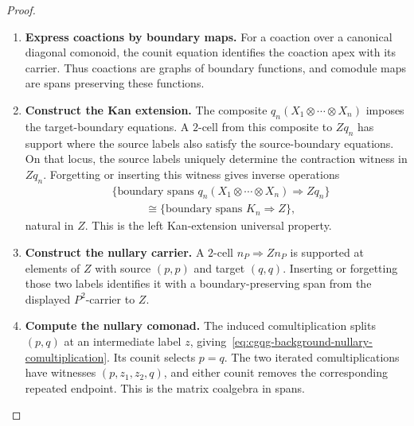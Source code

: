 \documentclass[oneside]{article}
\theoremstyle{plain}
\theoremstyle{definition}
\theoremstyle{remark}
\begin{document}
\begin{proof}
    \leavevmode
    \begin{enumerate}[beginpenalty=10000]
        \item \textbf{Express coactions by boundary maps.} For a coaction over a canonical diagonal comonoid, the counit equation identifies the coaction apex with its carrier. Thus coactions are graphs of boundary functions, and comodule maps are spans preserving these functions.

        \item \textbf{Construct the Kan extension.} The composite \(q_n(X_1\otimes\cdots\otimes X_n)\) imposes the
        target-boundary equations. A \(2\)-cell from this composite to \(Zq_n\)
        has support where the source labels also satisfy the
        source-boundary equations. On that locus, the source labels uniquely
        determine the contraction witness in \(Zq_n\).
        Forgetting or inserting this witness gives inverse operations
        \[
        \begin{aligned}
        &\{\text{boundary spans }q_n(X_1\otimes\cdots\otimes X_n)\Rightarrow Zq_n\}\\
        &\hspace{3em}\cong\{\text{boundary spans }K_n\Rightarrow Z\},
        \end{aligned}
        \]
        natural in \(Z\). This is the left Kan-extension universal property.

        \item \textbf{Construct the nullary carrier.} A \(2\)-cell \(n_P\Rightarrow Zn_P\) is supported at elements of \(Z\) with source \((p,p)\) and target \((q,q)\). Inserting or forgetting those two labels identifies it with a boundary-preserving span from the displayed \(P^2\)-carrier to \(Z\).

        \item \textbf{Compute the nullary comonad.} The induced comultiplication splits \((p,q)\) at an intermediate label \(z\), giving~\eqref{eq:cgqg-background-nullary-comultiplication}. Its counit selects \(p=q\). The two iterated comultiplications have witnesses \((p,z_1,z_2,q)\), and either counit removes the corresponding repeated endpoint. This is the matrix coalgebra in spans. \qedhere
    \end{enumerate}
\end{proof}
\end{document}
